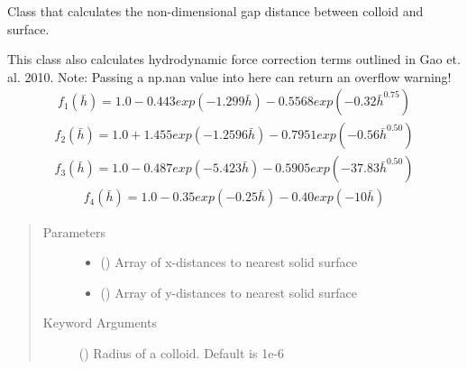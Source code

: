 \documentclass[letterpaper,10pt,english]{sphinxmanual}
\begin{document}
\begin{fulllineitems}
\label{\detokenize{index:lb_colloids.Colloids.Colloid_Math.Gap}}
Class that calculates the non-dimensional gap distance between colloid and surface.

This class also calculates hydrodynamic force correction terms outlined in Gao et. al. 2010.
Note: Passing a np.nan value into here can return an overflow warning!
\begin{equation*}
\begin{split}f_{1}(\bar{h}) = 1.0 - 0.443 exp(-1.299\bar{h}) - 0.5568 exp(-0.32\bar{h}^{0.75})\end{split}
\end{equation*}\begin{equation*}
\begin{split}f_{2}(\bar{h}) = 1.0 + 1.455 exp(-1.2596\bar{h}) - 0.7951 exp(-0.56\bar{h}^{0.50})\end{split}
\end{equation*}\begin{equation*}
\begin{split}f_{3}(\bar{h}) = 1.0 - 0.487 exp(-5.423\bar{h}) - 0.5905 exp(-37.83\bar{h}^{0.50})\end{split}
\end{equation*}\begin{equation*}
\begin{split}f_{4}(\bar{h}) = 1.0 - 0.35 exp(-0.25\bar{h}) - 0.40 exp(-10\bar{h})\end{split}
\end{equation*}\begin{quote}\begin{description}
\item[{Parameters}] \leavevmode\begin{itemize}
\item {} 
 () \textendash{} Array of x-distances to nearest solid surface

\item {} 
 () \textendash{} Array of y-distances to nearest solid surface

\end{itemize}

\item[{Keyword Arguments}] \leavevmode
{} () \textendash{} Radius of a colloid. Default is 1e-6


\end{description}
\end{quote}
\end{fulllineitems}
\end{document}
